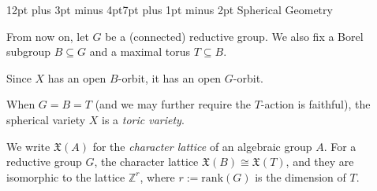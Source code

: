 \documentclass[11pt, oneside]{amsart}
\makeatletter
\newtheorem{lemma}[theorem]{Lemma}
\newcommand{\<}{\left\langle} \renewcommand{\>}{\right\rangle}
\renewcommand{\subsection}{\@startsection{subsection}{2}{\z@}%
  {12pt plus 3pt minus 4pt}{7pt plus 1pt minus 2pt}%
  {\normalfont\bfseries}}
\newcommand{\rank}{\mathrm{rank}}
\makeatother
\begin{document}



\subsection{Spherical Geometry}\label{sec:prelim:sph}

\newcommand{\ch}{\mathfrak{X}}

From now on, let $G$ be a (connected) reductive group. We also fix a Borel subgroup $B \subseteq G$ and a maximal torus $T \subseteq B$.

\begin{remark*}
	Since $X$ has an open $B$-orbit, it has an open $G$-orbit.
\end{remark*}

\begin{example}
	When $G = B = T$ (and we may further require the $T$-action is faithful), the spherical variety $X$ is a \emph{toric variety}.
\end{example}

We write $\ch(A)$ for the \emph{character lattice} of an algebraic group $A$. For a reductive group $G$, the character lattice $\ch(B) \cong \ch(T)$, and they are isomorphic to the lattice $\mathbb{Z}^r$, where $r := \rank(G)$ is the dimension of $T$.




\end{document}
